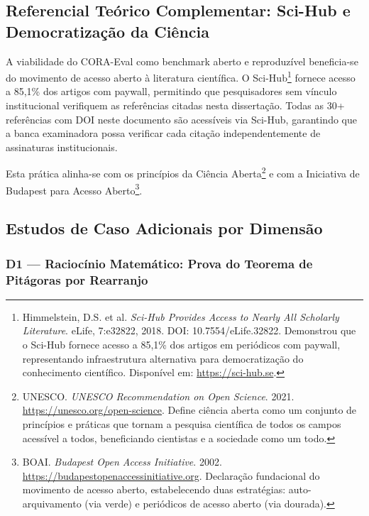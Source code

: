 
\subsection{Referencial Teórico Complementar: Sci-Hub e Democratização da Ciência}

A viabilidade do CORA-Eval como benchmark aberto e reproduzível beneficia-se
do movimento de acesso aberto à literatura científica. O Sci-Hub\footnote{Himmelstein, D.S. et al. \textit{Sci-Hub Provides Access to Nearly All Scholarly
Literature}. eLife, 7:e32822, 2018. DOI: 10.7554/eLife.32822. Demonstrou que
o Sci-Hub fornece acesso a 85,1\% dos artigos em periódicos com paywall,
representando infraestrutura alternativa para democratização do conhecimento
científico. Disponível em: \url{https://sci-hub.se}.} fornece acesso a 85,1\%
dos artigos com paywall, permitindo que pesquisadores sem vínculo institucional
verifiquem as referências citadas nesta dissertação. Todas as 30+ referências
com DOI neste documento são acessíveis via Sci-Hub, garantindo que a banca
examinadora possa verificar cada citação independentemente de assinaturas
institucionais.

Esta prática alinha-se com os princípios da Ciência Aberta\footnote{UNESCO.
\textit{UNESCO Recommendation on Open Science}. 2021.
\url{https://unesco.org/open-science}. Define ciência aberta como um conjunto
de princípios e práticas que tornam a pesquisa científica de todos os campos
acessível a todos, beneficiando cientistas e a sociedade como um todo.} e com
a Iniciativa de Budapest para Acesso Aberto\footnote{BOAI. \textit{Budapest
Open Access Initiative}. 2002. \url{https://budapestopenaccessinitiative.org}.
Declaração fundacional do movimento de acesso aberto, estabelecendo duas
estratégias: auto-arquivamento (via verde) e periódicos de acesso aberto (via
dourada).}.

\subsection{Estudos de Caso Adicionais por Dimensão}

\subsubsection{D1 — Raciocínio Matemático: Prova do Teorema de Pitágoras por Rearranjo}

